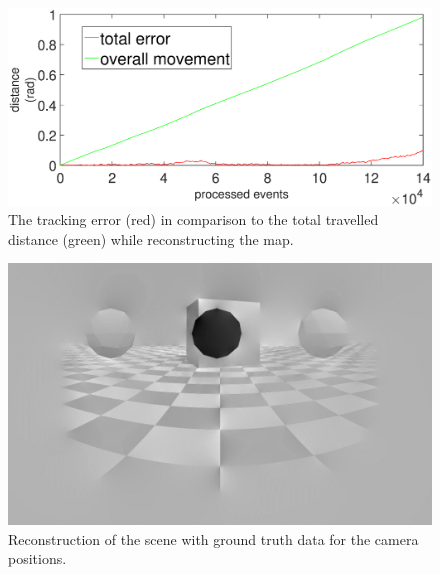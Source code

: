 \begin{figure}
\includegraphics[width=\linewidth]{images/Tracking_error_during_reconstruction.eps}
\caption{The tracking error (red) in comparison to the total travelled distance (green)
while reconstructing the map.
}
\label{fig:tracking_error_reconstruction}
\end{figure}

\begin{figure}
\includegraphics[width=\linewidth]{images/simulation_reconstruction.jpg}
\caption{Reconstruction of the scene with ground truth data for the camera positions.}
\label{fig:reconstruction_only}
\end{figure}


